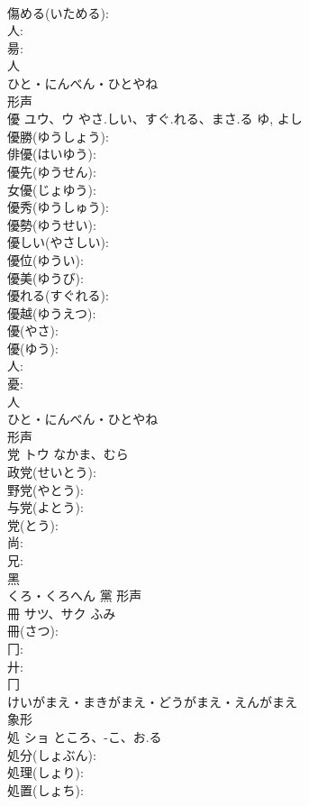 \documentclass[8pt]{extreport}
\begin{document}
\begin{CJK}{UTF8}{min}
\\	傷める(いためる): 
\\	人: 
\\	昜: 
\\	人	
\\	ひと・にんべん・ひとやね	
\\	形声 
\\	優	ユウ、ウ	やさ.しい、すぐ.れる、まさ.る	ゆ, よし	
\\	優勝(ゆうしょう): 
\\	俳優(はいゆう): 
\\	優先(ゆうせん): 
\\	女優(じょゆう): 
\\	優秀(ゆうしゅう): 
\\	優勢(ゆうせい): 
\\	優しい(やさしい): 
\\	優位(ゆうい): 
\\	優美(ゆうび): 
\\	優れる(すぐれる): 
\\	優越(ゆうえつ): 
\\	優(やさ): 
\\	優(ゆう): 
\\	人: 
\\	憂: 
\\	人	
\\	ひと・にんべん・ひとやね	
\\	形声 
\\	党	トウ	なかま、むら		
\\	政党(せいとう): 
\\	野党(やとう): 
\\	与党(よとう): 
\\	党(とう): 
\\	尚: 
\\	兄: 
\\	黑	
\\	くろ・くろへん	黨	形声 
\\	冊	サツ、サク	ふみ		
\\	冊(さつ): 
\\	冂: 
\\	廾: 
\\	冂	
\\	けいがまえ・まきがまえ・どうがまえ・えんがまえ	
\\	象形 
\\	処	ショ	ところ、-こ、お.る		
\\	処分(しょぶん): 
\\	処理(しょり): 
\\	処置(しょち): 

\end{CJK}
\end{document}
